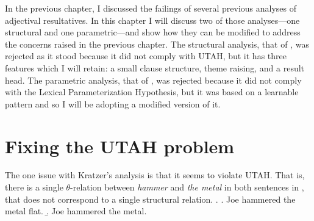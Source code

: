 \documentclass[MilwayThesis]{subfiles}
\begin{document}
In the previous chapter, I discussed the failings of several previous analyses of adjectival resultatives.
In this chapter I will discuss two of those analyses---one structural and one parametric---and show how they can be modified to address the concerns raised in the previous chapter.
The structural analysis, that of \textcite{kratzer2004building}, was rejected as it stood because it did not comply with UTAH, but it has three features which I will retain: a small clause structure, theme raising, and a result head.
The parametric analysis, that of \textcite{snyder1995language,snyder2012parameter}, was rejected because it did not comply with the Lexical Parameterization Hypothesis, but it was based on a learnable pattern and so I will be adopting a modified version of it.
\section{Fixing the UTAH problem}
The one issue with Kratzer's analysis is that it seems to violate UTAH.
That is, there is a single $\theta$-relation between \textit{hammer} and \textit{the metal} in both sentences in \Next, that does not correspond to a single structural relation.
\ex.
\a. Joe hammered the metal flat.
\b. Joe hammered the metal.
\end{document}
